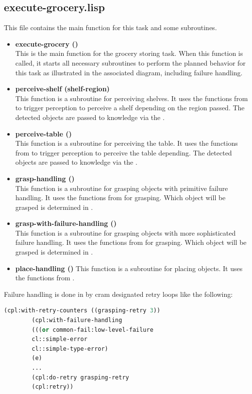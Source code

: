 \documentclass[main.tex]{subfiles}
\begin{document}
        \subsection{execute-grocery.lisp}
        \label{execute_grocery_planning_doku}
        This file contains the main function for this task and some subroutines.
        \begin{itemize}
            \item \textbf{execute-grocery ()} \\
            This is the main function for the grocery storing task. When this function is called, it starts all necessary subroutines to perform the planned behavior for this task as illustrated in the associated diagram, including failure handling.
            \item \textbf{perceive-shelf (shelf-region)} \\
            This function is a subroutine for perceiving shelves. It uses the functions from  to trigger perception to perceive a shelf depending on the region passed. The detected objects are passed to knowledge via the .
            \item \textbf{perceive-table ()} \\
            This function is a subroutine for perceiving the table. It uses the functions from  to trigger perception to perceive the table depending. The detected objects are passed to knowledge via the .
            \item \textbf{grasp-handling ()} \\
            This function is a subroutine for grasping objects with primitive failure handling. It uses the functions from  for grasping. Which object will be grasped is determined in .
            \item \textbf{grasp-with-failure-handling ()} \\
            This function is a subroutine for grasping objects with more sophisticated failure handling. It uses the functions from  for grasping. Which object will be grasped is determined in .
            \item \textbf{place-handling ()}
            This function is a subroutine for placing objects. It uses the functions from .
        \end{itemize}
        Failure handling is done in by cram designated retry loops like the following:
        \begin{lstlisting}[language=lisp]
        (cpl:with-retry-counters ((grasping-retry 3))
        (cpl:with-failure-handling
        (((or common-fail:low-level-failure 
        cl::simple-error
        cl::simple-type-error)
        (e)
        ...
        (cpl:do-retry grasping-retry
        (cpl:retry))
        \end{lstlisting}
        
\end{document}
